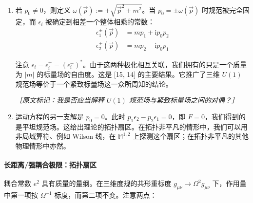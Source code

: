 \begin{enumerate}
  \item 若 $p_0\neq0$，则定义 $\omega(\vec p):=+\sqrt{\vec p^{2}+m^{2}}$。当 $p_0=\pm\omega(\vec p)$ 时规范被完全固定，而 $\epsilon_i$ 被确定到相差一个整体相乘的常数：
\begin{equation}
  \begin{aligned}
    \epsilon_1^{\pm}(\vec p) &=mp_1+\mathrm{i}p_0p_2\\
    \epsilon_2^{\pm}(\vec p) &=mp_2-\mathrm{i}p_0p_1
  \end{aligned}
  \tag{2.57}
  \label{eq:2.57}
\end{equation}

注意 $\epsilon_i=\epsilon_i^{+}=(\epsilon_i^{-})^{*}$。由于这两种极化相互关联，我们拥有的只是一个质量为 $|m|$ 的标量场的自由度。这是 [15, 14] 的主要结果。它推广了三维 $U(1)$ 规范场等价于一个紧致标量场这一众所周知的结论。

{\small\itshape ［原文标记：我是否应当解释 $U(1)$ 规范场与紧致标量场之间的对偶？］}%


  \item 运动方程的另一支解是 $p_0=0$。此时 $p_1\epsilon_2-p_2\epsilon_1=0$，即 $F=0$，我们得到的是平坦规范场。这给出理论的拓扑扇区。在拓扑非平凡的情形中，我们可以用非局域算符、例如 Wilson 线，在 $\mathbb{M}^{1,2}$ 上探测这个扇区；在拓扑非平凡的其他物理情形中亦然。
\end{enumerate}

\paragraph{长距离/强耦合极限：拓扑扇区} %

耦合常数 $e^{2}$ 具有质量的量纲。在三维度规的共形重标度 $g_{\mu\nu}\to\Omega^{2}g_{\mu\nu}$ 下，作用量中第一项按 $\Omega^{-1}$ 标度，而第二项不变。注意两点：

